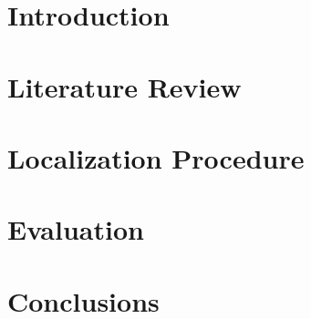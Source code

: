 \documentclass[conference]{IEEEtran}
\begin{document}
\section{Introduction} \label{introduction}
  
  
\section{Literature Review} \label{literature}
  
  
\section{Localization Procedure} \label{locProc}
  

\section{Evaluation} \label{simulation}
  

\section{Conclusions} \label{conclusions}
  
  


  
\end{document}
